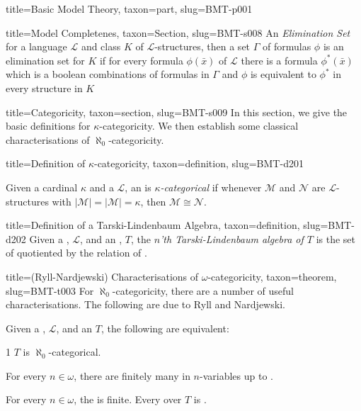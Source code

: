 \documentclass[a4paper]{article}
\begin{document}
\begin{tree}{title={Basic Model Theory}, taxon={part}, slug={BMT-p001}}
  
  
\begin{tree}{title={Model Completenes}, taxon={Section}, slug={BMT-s008}}
An \emph{Elimination Set} for a language \(\mathcal {L}\) and class \(K\) of \(\mathcal {L}\)-structures, then a set \(\Gamma\) of formulas \(\phi\) is an elimination set for \(K\) if for every formula \(\phi ( \bar {x})\) of \(\mathcal {L}\) there is a formula \(\phi ^*( \bar {x})\) which is a boolean combinations of formulas in \(\Gamma\) and \(\phi\) is equivalent to \(\phi ^*\) in every structure in \(K\)
\end{tree}


  
  
\begin{tree}{title={Categoricity}, taxon={section}, slug={BMT-s009}}
In this section, we give the basic definitions for \(\kappa\)-categoricity. We then establish some classical characterisations of \(\aleph _0\)-categoricity.
\begin{tree}{title={Definition of \(\kappa\)-categoricity}, taxon={definition}, slug={BMT-d201}}

    Given a cardinal \(\kappa\) and a  \(\mathcal {L}\), an  is \emph{\(\kappa\)-categorical} if whenever \(\mathcal {M}\) and \(\mathcal {N}\) are \(\mathcal {L}\)-structures with \(| \mathcal {M}|=| \mathcal {M}|= \kappa\), then \(\mathcal {M}  \cong   \mathcal {N}\). 

\end{tree}

\begin{tree}{title={Definition of a Tarski-Lindenbaum Algebra}, taxon={definition}, slug={BMT-d202}}
Given a , \(\mathcal {L}\), and an , \(T\), the \emph{\(n\)'th Tarski-Lindenbaum algebra of \(T\)} is the set of  quotiented by the relation of .
\end{tree}

\begin{tree}{title={(Ryll-Nardjewski) Characterisations of \(\omega\)-categoricity}, taxon={theorem}, slug={BMT-t003}}
For \(\aleph _0\)-categoricity, there are a number of useful characterisations. The following are due to Ryll and Nardjewski.\par{Given a , \(\mathcal {L}\), and an  \(T\), the following are equivalent:}\par{1 \(T\) is \(\aleph _0\)-categorical.}\par{For every \(n \in   \omega\), there are finitely many  in \(n\)-variables up to .}\par{For every \(n \in   \omega\), the  is finite. 
Every  over \(T\) is . }
\end{tree}


\end{tree}
\end{tree}
\end{document}
